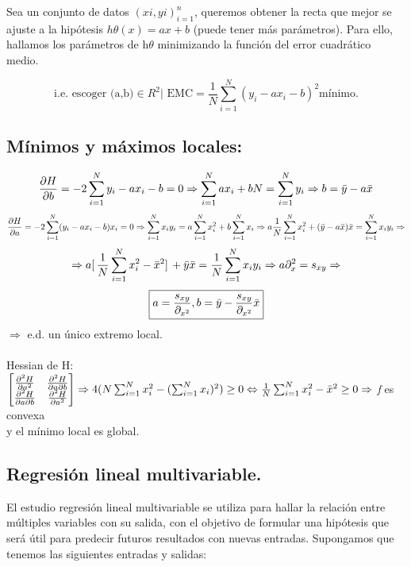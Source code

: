 \documentclass[a4paper,10pt]{article}
\begin{document}
Sea un conjunto de datos $(xi,yi)^n_{i=1}$, queremos obtener la recta  que mejor se ajuste a la hipótesis $h\theta(x)= ax+b$ (puede tener  más parámetros). Para ello, hallamos los parámetros de h$\theta$  minimizando la función del error cuadrático medio.

\[ \text{i.e. escoger (a,b)} \in R^2 | \text{ EMC} = \frac{1}{N} \sum_{i=1}^{N}(y_{i}-ax_{i}-b)^2 \text{mínimo.} \]
\subsection{Mínimos y máximos locales:}
\[\frac{\partial{H}}{\partial{b}}=-2\sum_{i=1}^{N}y_{i}-ax_{i}-b=0\Rightarrow \sum_{i=1}^{N}ax_{i}+bN=\sum_{i=1}^{N}y_{i}\Rightarrow b=\Bar{y}-a\Bar{x}\]
\[\frac{\partial{H}}{\partial{a}}=-2\sum_{i=1}^{N}(y_{i}-ax_{i}-b)x_{i}=0\Rightarrow \sum_{i=1}^{N}x_{i}y_{i}=a\sum_{i=1}^{N}x_{i}^2+b\sum_{i=1}^{N}x_{i}\Rightarrow a \frac{1}{N}\sum_{i=1}^{N}x_{i}^2+(\Bar{y}-a\Bar{x})\Bar{x}=\sum_{i=1}^{N}x_{i}y_{i}\Rightarrow\] 
\[\Rightarrow a[ \,\frac{1}{N} \sum_{i=1}^{N} x_{i}^2-\Bar{x}^2] \,+\Bar{y}\Bar{x}=\frac{1}{N}\sum_{i=1}^{N}x_{i}y_{i}\Rightarrow a\partial_x^2=s_{xy}\Rightarrow\]
\[\boxed{a=\frac{s_{xy}}{\partial_{x^2}}, b=\Bar{y}-\frac{s_{xy}}{\partial_{x^2}}\Bar{x}}\]
$\Rightarrow$ e.d. un único extremo local.\\
\\
Hessian de H: $
\begin{bmatrix}
    \frac{\partial^2 H}{\partial a^2} & \frac{\partial^2 H}{\partial a \partial b} \\
    \frac{\partial^2 H}{\partial a \partial b} & \frac{\partial^2 H}{\partial a^2}
\end{bmatrix} \Rightarrow 4(N\sum_{i=1}^{N}x_{i}^2-(\sum_{i=1}^{N}x_{i})^2)\geq 0 \Leftrightarrow \frac{1}{N}\sum_{i=1}^{N}x_{i}^2 - \Bar{x}^2 \geq 0 \Rightarrow$ \textit{f} es convexa \\ y el mínimo local es global.

\subsection{Regresión lineal multivariable.}

El estudio regresión lineal multivariable se utiliza para hallar la relación entre múltiples variables con su salida, con el objetivo de formular una hipótesis que será útil para predecir futuros resultados con nuevas entradas. Supongamos que tenemos las siguientes entradas y salidas: 
\end{document}
